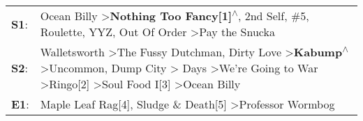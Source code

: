 \begin{supertabular}{p{0.03\textwidth}p{0.92\textwidth}}
 \textbf{S1}:  &                                                                                                                                                                                                           Ocean Billy\textsuperscript{} \textgreater \enspace \textbf{Nothing Too Fancy[1]\textsuperscript{$\wedge$}}, \enspace 2nd Self\textsuperscript{}, \enspace \#5\textsuperscript{}, \enspace Roulette\textsuperscript{}, \enspace YYZ\textsuperscript{}, \enspace Out Of Order\textsuperscript{} \textgreater \enspace Pay the Snucka\textsuperscript{}  \enspace  \\
 \textbf{S2}:  &  Walletsworth\textsuperscript{} \textgreater \enspace The Fussy Dutchman\textsuperscript{}, \enspace Dirty Love\textsuperscript{} \textgreater \enspace \textbf{Kabump\textsuperscript{$\wedge$}} \textgreater \enspace Uncommon\textsuperscript{}, \enspace Dump City\textsuperscript{} \textgreater {} Days\textsuperscript{} \textgreater \enspace We're Going to War\textsuperscript{} \textgreater \enspace Ringo[2]\textsuperscript{} \textgreater \enspace Soul Food I[3]\textsuperscript{} \textgreater \enspace Ocean Billy\textsuperscript{}  \enspace  \\
 \textbf{E1}:  &                                                                                                                                                                                                                                                                                                                                                                                                                    Maple Leaf Rag[4]\textsuperscript{}, \enspace Sludge \& Death[5]\textsuperscript{} \textgreater \enspace Professor Wormbog\textsuperscript{}  \enspace  \\
\end{supertabular}
